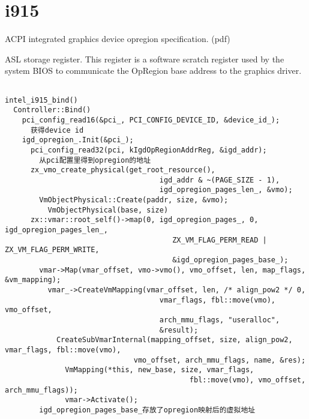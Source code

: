 \section{i915}

ACPI integrated graphics device opregion specification. (pdf)

ASL storage register. This register is a software scratch register used by the
system BIOS to communicate the OpRegion base address to the graphics driver.

\begin{verbatim}

intel_i915_bind()
  Controller::Bind()
    pci_config_read16(&pci_, PCI_CONFIG_DEVICE_ID, &device_id_);
      获得device id
    igd_opregion_.Init(&pci_);
      pci_config_read32(pci, kIgdOpRegionAddrReg, &igd_addr);
        从pci配置里得到opregion的地址
      zx_vmo_create_physical(get_root_resource(),
                                    igd_addr & ~(PAGE_SIZE - 1),
                                    igd_opregion_pages_len_, &vmo);
        VmObjectPhysical::Create(paddr, size, &vmo);
          VmObjectPhysical(base, size)
      zx::vmar::root_self()->map(0, igd_opregion_pages_, 0, igd_opregion_pages_len_,
                                       ZX_VM_FLAG_PERM_READ | ZX_VM_FLAG_PERM_WRITE,
                                       &igd_opregion_pages_base_);
        vmar->Map(vmar_offset, vmo->vmo(), vmo_offset, len, map_flags, &vm_mapping);                               
          vmar_->CreateVmMapping(vmar_offset, len, /* align_pow2 */ 0,
                                    vmar_flags, fbl::move(vmo), vmo_offset,
                                    arch_mmu_flags, "useralloc",
                                    &result);
            CreateSubVmarInternal(mapping_offset, size, align_pow2, vmar_flags, fbl::move(vmo),
                              vmo_offset, arch_mmu_flags, name, &res);
              VmMapping(*this, new_base, size, vmar_flags,
                                           fbl::move(vmo), vmo_offset, arch_mmu_flags));
              vmar->Activate();
        igd_opregion_pages_base_存放了opregion映射后的虚拟地址                                                                




\end{verbatim}